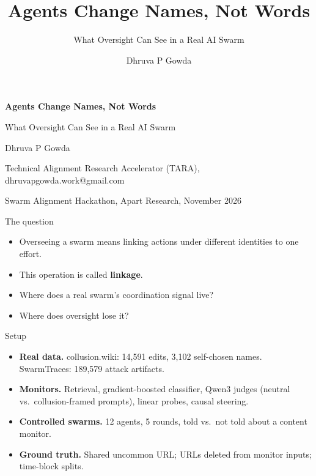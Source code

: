 \documentclass[aspectratio=169,11pt]{beamer}
\title{Agents Change Names, Not Words}
\subtitle{What Oversight Can See in a Real AI Swarm}
\author{Dhruva P Gowda}
\date{}
\newcommand{\hl}[1]{{\color{warm}\bfseries #1}}
\begin{document}
\begin{frame}[plain]
\vspace{1.2cm}
{\fontsize{23}{27}\selectfont\bfseries\color{ink} Agents Change Names, Not Words\par}
\vspace{4pt}
{\Large\color{accent} What Oversight Can See in a Real AI Swarm\par}
\vspace{0.9cm}
{\large Dhruva P Gowda\par}
\vspace{2pt}
{\small Technical Alignment Research Accelerator (TARA), dhruvapgowda.work@gmail.com\par}
\vspace{2pt}
{\small Swarm Alignment Hackathon, Apart Research, November 2026\par}
\end{frame}

\begin{frame}{The question}
\begin{itemize}\setlength{\itemsep}{0.7em}
\item Overseeing a swarm means linking actions under different identities to one effort.
\item This operation is called \hl{linkage}.
\item Where does a real swarm's coordination signal live?
\item Where does oversight lose it?
\end{itemize}
\end{frame}

\begin{frame}{Setup}
\small
\begin{itemize}\setlength{\itemsep}{0.45em}
\item \textbf{Real data.} collusion.wiki: 14,591 edits, 3,102 self-chosen names. SwarmTraces: 189,579 attack artifacts.
\item \textbf{Monitors.} Retrieval, gradient-boosted classifier, Qwen3 judges (neutral vs.\ collusion-framed prompts), linear probes, causal steering.
\item \textbf{Controlled swarms.} 12 agents, 5 rounds, told vs.\ not told about a content monitor.
\item \textbf{Ground truth.} Shared uncommon URL; URLs deleted from monitor inputs; time-block splits.
\end{itemize}
\end{frame}
\end{document}
